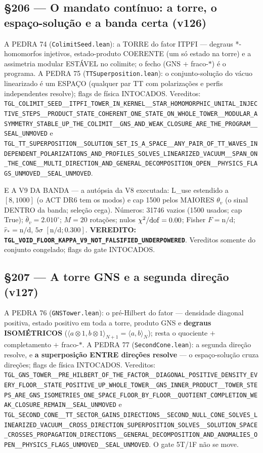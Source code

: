 \documentclass[11pt]{article}
\theoremstyle{definition}\newtheorem{deriv}{Derivação}
\begin{document}
\subsection*{\S206 --- O mandato contínuo: a torre, o espaço-solução e a banda certa (v126)}A PEDRA 74 (\texttt{ColimitSeed.lean}): a TORRE do fator ITPFI — degraus *-homomorfos injetivos, estado-produto COERENTE (um só estado na torre) e a assimetria modular ESTÁVEL no colimite; o fecho (GNS $+$ fraco-$*$) é o programa. A PEDRA 75 (\texttt{TTSuperposition.lean}): o conjunto-solução do vácuo linearizado é um ESPAÇO (qualquer par TT com polarizações e perfis independentes resolve); flags de física INTOCADOS. Vereditos: \texttt{TGL\_COLIMIT\_SEED\_\_ITPFI\_TOWER\_IN\_KERNEL\_\_STAR\_HOMOMORPHIC\_UNITAL\_INJECTIVE\_STEPS\_\_PRODUCT\_STATE\_COHERENT\_ONE\_STATE\_ON\_WHOLE\_TOWER\_\_MODULAR\_ASYMMETRY\_STABLE\_UP\_THE\_COLIMIT\_\_GNS\_AND\_WEAK\_CLOSURE\_ARE\_THE\_PROGRAM\_\_SEAL\_UNMOVED} e \texttt{TGL\_TT\_SUPERPOSITION\_\_SOLUTION\_SET\_IS\_A\_SPACE\_\_ANY\_PAIR\_OF\_TT\_WAVES\_INDEPENDENT\_POLARIZATIONS\_AND\_PROFILES\_SOLVES\_LINEARIZED\_VACUUM\_\_SPAN\_ON\_THE\_CONE\_\_MULTI\_DIRECTION\_AND\_GENERAL\_DECOMPOSITION\_OPEN\_\_PHYSICS\_FLAGS\_UNMOVED\_\_SEAL\_UNMOVED}.

E A V9 DA BANDA — a autópsia da V8 executada: L\_use estendido a $[8,1000]$ (o ACT DR6 tem os modos) e cap 1500 pelos MAIORES $\theta_v$ (o sinal DENTRO da banda; seleção cega). Números: 31746 vazios (1500 usados; cap True); $\bar\theta_v=2.010^{\circ}$; $M=20$ rotações; nulos $\chi^2/{\rm dof}=0.00$; Fisher $F=\text{n/d}$; $\hat r_*=\text{n/d}$, $5\sigma$ $[\text{n/d};0.300]$. \textbf{VEREDITO: \texttt{TGL\_VOID\_FLOOR\_KAPPA\_V9\_NOT\_FALSIFIED\_UNDERPOWERED}}. Vereditos somente do conjunto congelado; flags do gate INTOCADOS.

\subsection*{\S207 --- A torre GNS e a segunda direção (v127)}A PEDRA 76 (\texttt{GNSTower.lean}): o pré-Hilbert do fator — densidade diagonal positiva, estado positivo em toda a torre, produto GNS e \textbf{degraus ISOMÉTRICOS} ($\langle a\otimes1,b\otimes1\rangle_{N+1}=\langle a,b\rangle_N$); resta o quociente $+$ completamento $+$ fraco-$*$. A PEDRA 77 (\texttt{SecondCone.lean}): a segunda direção resolve, e \textbf{a superposição ENTRE direções resolve} — o espaço-solução cruza direções; flags de física INTOCADOS. Vereditos: \texttt{TGL\_GNS\_TOWER\_\_PRE\_HILBERT\_OF\_THE\_FACTOR\_\_DIAGONAL\_POSITIVE\_DENSITY\_EVERY\_FLOOR\_\_STATE\_POSITIVE\_UP\_WHOLE\_TOWER\_\_GNS\_INNER\_PRODUCT\_\_TOWER\_STEPS\_ARE\_GNS\_ISOMETRIES\_ONE\_SPACE\_FLOOR\_BY\_FLOOR\_\_QUOTIENT\_COMPLETION\_WEAK\_CLOSURE\_REMAIN\_\_SEAL\_UNMOVED} e \texttt{TGL\_SECOND\_CONE\_\_TT\_SECTOR\_GAINS\_DIRECTIONS\_\_SECOND\_NULL\_CONE\_SOLVES\_LINEARIZED\_VACUUM\_\_CROSS\_DIRECTION\_SUPERPOSITION\_SOLVES\_\_SOLUTION\_SPACE\_CROSSES\_PROPAGATION\_DIRECTIONS\_\_GENERAL\_DECOMPOSITION\_AND\_ANOMALIES\_OPEN\_\_PHYSICS\_FLAGS\_UNMOVED\_\_SEAL\_UNMOVED}. O gate 5T/1F não se move.
\end{document}

